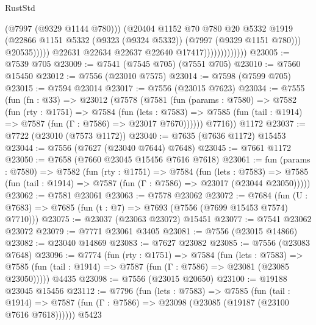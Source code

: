 \begin{lexlean}{RustStd}
\begin{coremodule}
                                        (@7997 (@9329 @1144 @780)))
                                      (@20404
                                        @1152
                                        @70
                                        @780
                                        @20
                                        @5332
                                        @1919
                                        (@22866
                                          @1151
                                          @5332
                                          (@9323 (@9324 @5332))
                                          (@7997 (@9329 @1151 @780)))
                                        @20535)))))
                              @22631
                              @22634
                              @22637
                              @22640
                              @17417)))))))))))))
@23005 := @7539 @705
@23009 := @7541 (@7545 @705) (@7551 @705)
@23010 := @7560 @15450
@23012 := @7556 (@23010 @7575)
@23014 := @7598 (@7599 @705)
@23015 := @7594 @23014
@23017 := @7556 (@23015 @7623)
@23034 := @7555
    (fun (fn : @33) =>
    @23012
      (@7578
        (@7581
          (fun (params : @7580) =>
          @7582
            (fun (rty : @1751) =>
            @7584
              (fun (lets : @7583) =>
              @7585 (fun (tail : @1914) => @7587 (fun (Γ : @7586) => @23017 @7670))))))
        @7716))
    @1172
@23037 := @7722 (@23010 (@7573 @1172))
@23040 := @7635 (@7636 @1172) @15453
@23044 := @7556 (@7627 (@23040 @7644) @7648)
@23045 := @7661 @1172
@23050 := @7658 (@7660 @23045 @15456 @7616 @7618)
@23061 := fun (params : @7580) =>
  @7582
    (fun (rty : @1751) =>
    @7584
      (fun (lets : @7583) =>
      @7585 (fun (tail : @1914) => @7587 (fun (Γ : @7586) => @23017 (@23044 @23050)))))
@23062 := @7581 @23061
@23063 := @7578 @23062
@23072 := @7684
    (fun (U : @7683) => @7685 (fun (t : @7) => @7693 (@7556 (@7699 @15453 @7574) @7710)))
@23075 := @23037 (@23063 @23072) @15451
@23077 := @7541 @23062 @23072
@23079 := @7771 @23061 @3405
@23081 := @7556 (@23015 @14866)
@23082 := @23040 @14869
@23083 := @7627 @23082
@23085 := @7556 (@23083 @7648)
@23096 := @7774
    (fun (rty : @1751) =>
    @7584
      (fun (lets : @7583) =>
      @7585 (fun (tail : @1914) => @7587 (fun (Γ : @7586) => @23081 (@23085 @23050)))))
    @4435
@23098 := @7556 (@23015 @20650)
@23100 := @19188 @23045 @15456
@23112 := @7796
    (fun (lets : @7583) =>
    @7585
      (fun (tail : @1914) =>
      @7587 (fun (Γ : @7586) => @23098 (@23085 (@19187 (@23100 @7616 @7618))))))
    @5423

\end{coremodule}
\end{lexlean}
